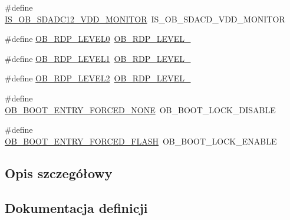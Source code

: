 \begin{DoxyCompactItemize}
\item 
\#define \hyperlink{group___h_a_l___f_l_a_s_h___aliased___defines_gafc1560626d243a2c9fbd72dbb65c8941}{I\+S\+\_\+\+O\+B\+\_\+\+S\+D\+A\+D\+C12\+\_\+\+V\+D\+D\+\_\+\+M\+O\+N\+I\+T\+OR}~I\+S\+\_\+\+O\+B\+\_\+\+S\+D\+A\+C\+D\+\_\+\+V\+D\+D\+\_\+\+M\+O\+N\+I\+T\+OR
\item 
\#define \hyperlink{group___h_a_l___f_l_a_s_h___aliased___defines_ga7339a05119a474a7bde67e9e500d38cb}{O\+B\+\_\+\+R\+D\+P\+\_\+\+L\+E\+V\+E\+L0}~\hyperlink{group___f_l_a_s_h_ex___option___bytes___read___protection_ga22c7871bda267a2844ab9ca9f7bd38e4}{O\+B\+\_\+\+R\+D\+P\+\_\+\+L\+E\+V\+E\+L\+\_}
\item 
\#define \hyperlink{group___h_a_l___f_l_a_s_h___aliased___defines_ga7291ec039ae68ee1471af8ef3310d326}{O\+B\+\_\+\+R\+D\+P\+\_\+\+L\+E\+V\+E\+L1}~\hyperlink{group___f_l_a_s_h_ex___option___bytes___read___protection_ga778207f0d12d87bbff9d55e985aba5bc}{O\+B\+\_\+\+R\+D\+P\+\_\+\+L\+E\+V\+E\+L\+\_}
\item 
\#define \hyperlink{group___h_a_l___f_l_a_s_h___aliased___defines_gae591fa55ccad5cc27b322a5fba9d6ca1}{O\+B\+\_\+\+R\+D\+P\+\_\+\+L\+E\+V\+E\+L2}~\hyperlink{group___f_l_a_s_h_ex___option___bytes___read___protection_ga2262afca565429ce2808d835c49e5ee6}{O\+B\+\_\+\+R\+D\+P\+\_\+\+L\+E\+V\+E\+L\+\_}
\item 
\#define \hyperlink{group___h_a_l___f_l_a_s_h___aliased___defines_ga666d4ab8a89488eaf7d2182abea35d52}{O\+B\+\_\+\+B\+O\+O\+T\+\_\+\+E\+N\+T\+R\+Y\+\_\+\+F\+O\+R\+C\+E\+D\+\_\+\+N\+O\+NE}~O\+B\+\_\+\+B\+O\+O\+T\+\_\+\+L\+O\+C\+K\+\_\+\+D\+I\+S\+A\+B\+LE
\item 
\#define \hyperlink{group___h_a_l___f_l_a_s_h___aliased___defines_gaecdfae7720771db018195097858fff93}{O\+B\+\_\+\+B\+O\+O\+T\+\_\+\+E\+N\+T\+R\+Y\+\_\+\+F\+O\+R\+C\+E\+D\+\_\+\+F\+L\+A\+SH}~O\+B\+\_\+\+B\+O\+O\+T\+\_\+\+L\+O\+C\+K\+\_\+\+E\+N\+A\+B\+LE
\end{DoxyCompactItemize}


\subsection{Opis szczegółowy}


\subsection{Dokumentacja definicji}
\mbox{\label{group___h_a_l___f_l_a_s_h___aliased___defines_gaf908de74b3e013ed30976d9e645354e2}} 

